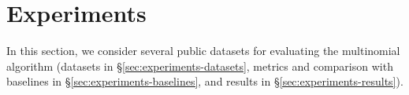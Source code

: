 \section{Experiments}\label{sec:experiments}
%
In this section, we consider several public datasets for evaluating the multinomial \algoFAIR algorithm (datasets in \S\ref{sec:experiments-datasets}, metrics and comparison with baselines in \S\ref{sec:experiments-baselines}, and results in \S\ref{sec:experiments-results}).

%
%


